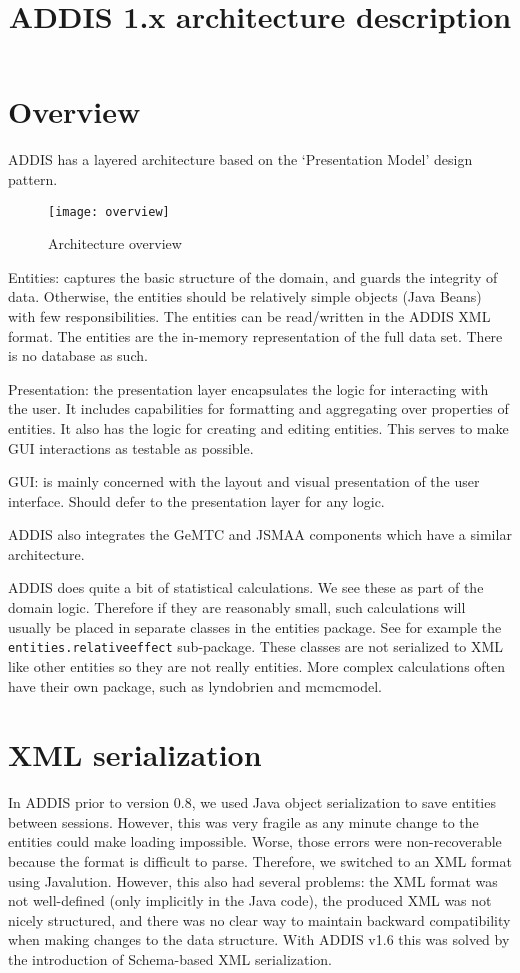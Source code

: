 \documentclass[a4paper]{article}
\title{ADDIS 1.x architecture description}
\begin{document}
\maketitle

\section{Overview}

ADDIS has a layered architecture based on the `Presentation Model' design pattern.

\begin{figure}[h]
\centering
\texttt{[image: overview]}
\caption{Architecture overview}
\end{figure}

Entities: captures the basic structure of the domain, and guards the integrity of data.
Otherwise, the entities should be relatively simple objects (Java Beans) with few responsibilities.
The entities can be read/written in the ADDIS XML format.
The entities are the in-memory representation of the full data set.
There is no database as such.

Presentation: the presentation layer encapsulates the logic for interacting with the user.
It includes capabilities for formatting and aggregating over properties of entities.
It also has the logic for creating and editing entities.
This serves to make GUI interactions as testable as possible.

GUI: is mainly concerned with the layout and visual presentation of the user interface.
Should defer to the presentation layer for any logic.

ADDIS also integrates the GeMTC and JSMAA components which have a similar architecture.

ADDIS does quite a bit of statistical calculations.
We see these as part of the domain logic.
Therefore if they are reasonably small, such calculations will usually be placed in separate classes in the entities package.
See for example the {\tt entities.relativeeffect} sub-package.
These classes are not serialized to XML like other entities so they are not really entities.
More complex calculations often have their own package, such as lyndobrien and mcmcmodel.

\section{XML serialization}

In ADDIS prior to version 0.8, we used Java object serialization to save entities between sessions.
However, this was very fragile as any minute change to the entities could make loading impossible.
Worse, those errors were non-recoverable because the format is difficult to parse.
Therefore, we switched to an XML format using Javalution.
However, this also had several problems: the XML format was not well-defined (only implicitly in the Java code), the produced XML was not nicely structured, and there was no clear way to maintain backward compatibility when making changes to the data structure.
With ADDIS v1.6 this was solved by the introduction of Schema-based XML serialization.
\end{document}
